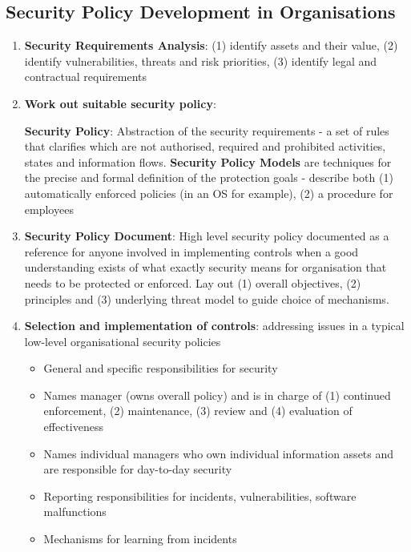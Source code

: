 \documentclass{article}
\newenvironment{definition}{\par\color{blue}}{\par}
\begin{document}
\subsection{Security Policy Development in Organisations}
\begin{enumerate}
	\item \textbf{Security Requirements Analysis}: (1) identify assets and their value, (2) identify vulnerabilities, threats and risk priorities, (3) identify legal and contractual requirements
	
	\item \textbf{Work out suitable security policy}: 
	\begin{definition}
		\textbf{Security Policy}: Abstraction of the security requirements - a set of rules that clarifies which are not authorised, required and prohibited activities, states and information flows. \textbf{Security Policy Models} are techniques for the precise and formal definition of the protection goals - describe both (1) automatically enforced policies (in an OS for example), (2) a procedure for employees
	\end{definition}
	
	\item \textbf{Security Policy Document}: High level security policy documented as a reference for anyone involved in implementing controls when a good understanding exists of what exactly security means for organisation that needs to be protected or enforced. Lay out (1) overall objectives, (2) principles and (3) underlying threat model to guide choice of mechanisms.
	
	\item \textbf{Selection and implementation of controls}: addressing issues in a typical low-level organisational security policies
	\begin{itemize}
		\item General and specific responsibilities for security
		\item Names manager (owns overall policy) and is in charge of (1) continued enforcement, (2) maintenance, (3) review and (4) evaluation of effectiveness
		\item Names individual managers who own individual information assets and are responsible for day-to-day security
		\item Reporting responsibilities for incidents, vulnerabilities, software malfunctions
		\item Mechanisms for learning from incidents
	\end{itemize}
\end{enumerate}
\end{document}
